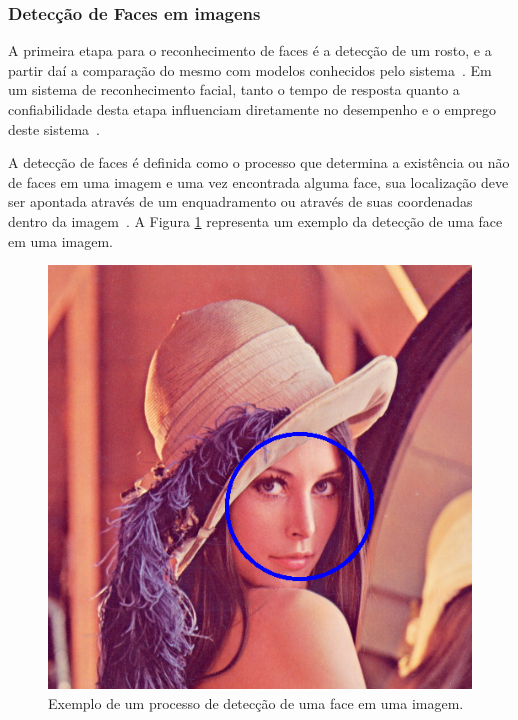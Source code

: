 
\subsubsection{Detecção de Faces em imagens}
	
A primeira etapa para o reconhecimento de faces é a detecção de um rosto, e a partir daí a comparação do mesmo com modelos conhecidos pelo sistema~\cite{hong, oliveira}. Em um sistema de reconhecimento facial, tanto o tempo de resposta quanto a confiabilidade desta etapa influenciam diretamente no desempenho e o emprego deste sistema~\cite{oliveira}.

A detecção de faces é definida como o processo que determina a existência ou não de faces em uma imagem e uma vez encontrada alguma face, sua localização deve ser apontada através de um enquadramento ou através de suas coordenadas dentro da imagem~\cite{oliveira}. A Figura \ref{enquadramentoRosto} representa um exemplo da detecção de uma face em uma imagem.

	\begin{figure}[hbt]
		\begin{center}
			\includegraphics[scale=0.3]{figuras/2.FundamentacaoTeorica/enquadramentoRosto.png}
		\end{center}
		\caption{Exemplo de um processo de detecção de uma face em uma imagem.}
		\label{enquadramentoRosto}
	\end{figure}

